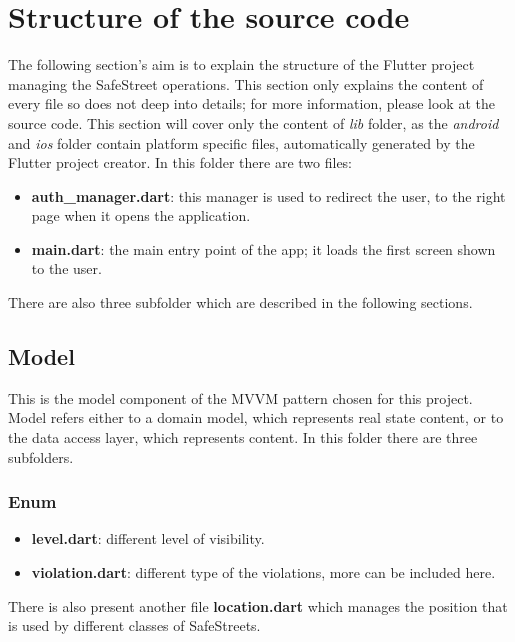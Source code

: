 \documentclass[../ITD.tex]{subfiles}
\begin{document}
    \chapter{Structure of the source code}\label{ch:structure-of-the-source-code}
    The following section's aim is to explain the structure of the Flutter project managing the SafeStreet operations.
    This section only explains the content of every file so does not deep into details;
    for more information, please look at the source code.
    This section will cover only the content of \textit{lib} folder, as the \textit{android} and \textit{ios} folder contain platform specific files,
    automatically generated by the Flutter project creator.
    In this folder there are two files:
    \begin{itemize}
        \item \textbf{auth\_manager.dart}: this manager is used to redirect the user, to the right page when it opens the application.
        \item \textbf{main.dart}: the main entry point of the app; it loads the first screen shown to the user.
    \end{itemize}
    There are also three subfolder which are described in the following sections.
    \section{Model}\label{sec:model}
    This is the model component of the MVVM pattern chosen for this project.
    Model refers either to a domain model, which represents real state content, or to the data access layer, which represents content.
    In this folder there are three subfolders.
    \subsection{Enum}\label{subsec:enum}
    \begin{itemize}
        \item \textbf{level.dart}: different level of visibility.
        \item \textbf{violation.dart}: different type of the violations, more can be included here.
    \end{itemize}
    There is also present another file \textbf{location.dart} which manages the position that is used by different classes of SafeStreets.
\end{document}
